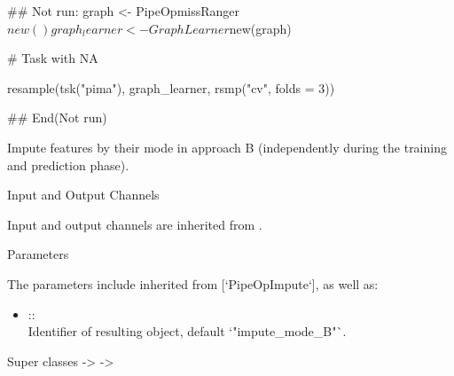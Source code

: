 \documentclass[letterpaper]{book}
\begin{document}
%
\begin{Examples}
\begin{ExampleCode}
## Not run: 
  graph <- PipeOpmissRanger$new() %
  graph_learner <- GraphLearner$new(graph)

  # Task with NA

  resample(tsk("pima"), graph_learner, rsmp("cv", folds = 3))

## End(Not run)
\end{ExampleCode}
\end{Examples}
%
\begin{Description}\relax
Impute features by their mode in approach B (independently during the training and prediction phase).
\end{Description}
%
\begin{Section}{Input and Output Channels}

Input and output channels are inherited from .
\end{Section}
%
\begin{Section}{Parameters}

The parameters include inherited from [`PipeOpImpute`], as well as: \\{}
\begin{itemize}

\item{}  :: \\{}
Identifier of resulting object, default `"impute\_mode\_B"`.

\end{itemize}

\end{Section}
%
\begin{Section}{Super classes}
 ->  -> 
\end{Section}
%
\end{document}
